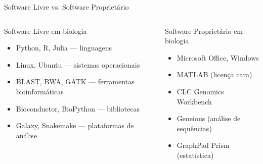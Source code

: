 \begin{frame}[shrink=10]{Software Livre vs. Software Proprietário}

\vspace{0.2cm}

\begin{columns}
\begin{exampleblock}{Software Livre em biologia}
\begin{itemize}
    \item Python, R, Julia — linguagens
    \item Linux, Ubuntu — sistemas operacionais
    \item BLAST, BWA, GATK — ferramentas bioinformáticas
    \item Bioconductor, BioPython — bibliotecas
    \item Galaxy, Snakemake — plataformas de análise
\end{itemize}
\end{exampleblock}

\begin{alertblock}{Software Proprietário em biologia}
\begin{itemize}
    \item Microsoft Office, Windows
    \item MATLAB (licença cara)
    \item CLC Genomics Workbench
    \item Geneious (análise de sequências)
    \item GraphPad Prism (estatística)
\end{itemize}
\end{alertblock}
\end{columns}
\end{frame}

